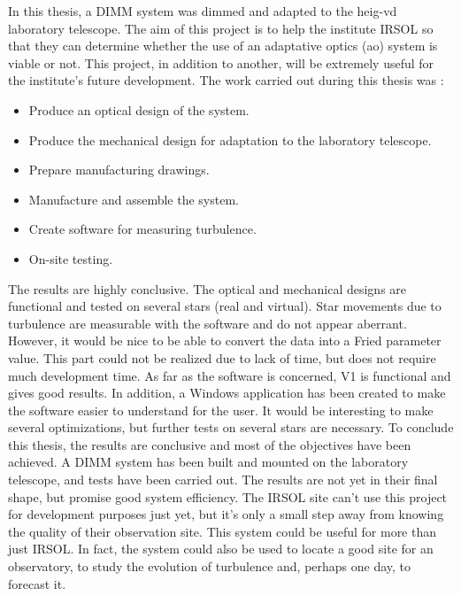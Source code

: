 In this thesis, a \Gls{DIMM} system was dimmed and adapted to the \Gls{heig-vd} laboratory telescope.
The aim of this project is to help the institute \Gls{IRSOL} so that they can determine whether the use of
an adaptative optics (\Gls{ao}) system is viable or not. This project, in addition to another,
will be extremely useful for the institute's future development.
\bigbreak
The work carried out during this thesis was :
\begin{itemize}
    \item Produce an optical design of the system.
    \item Produce the mechanical design for adaptation to the laboratory telescope.
    \item Prepare manufacturing drawings.
    \item Manufacture and assemble the system.
    \item Create software for measuring turbulence.
    \item On-site testing.
\end{itemize}
\bigbreak
The results are highly conclusive. \newline
The optical and mechanical designs are functional and tested on several stars (real and virtual). \newline
Star movements due to turbulence are measurable with the software and do not appear aberrant.
However, it would be nice to be able to convert the data into a Fried parameter value.
This part could not be realized due to lack of time, but does not require much development time.
\newline
As far as the software is concerned, V1 is functional and gives good results.
In addition, a Windows application has been created to make the software easier to understand for the user.
It would be interesting to make several optimizations, but further tests on several stars are necessary.
\bigbreak
To conclude this thesis, the results are conclusive and most of the objectives have been achieved.
A \Gls{DIMM} system has been built and mounted on the laboratory telescope, and tests have been carried out.
The results are not yet in their final shape, but promise good system efficiency.
The \Gls{IRSOL} site can't use this project for development purposes just yet, but it's only a small step away
from knowing the quality of their observation site.\newline
This system could be useful for more than just IRSOL. In fact, the system could also be used to locate a good site for 
an observatory, to study the evolution of turbulence and, perhaps one day, to forecast it.
\newpage
\vfil
\hspace{8cm}\makeatletter\@author\makeatother\par
\hspace{8cm}\begin{minipage}{5cm}
    \printsignature
\end{minipage}
